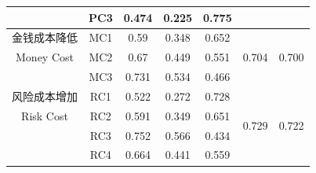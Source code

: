 \begin{table}[H]
\begin{tabular}{@{}ccccccc@{}}
            & PC3           & 0.474                                                                & 0.225                                                                 & 0.775                                                                    &                        &                              \\ \midrule
金钱成本降低      & MC1           & 0.59                                                                 & 0.348                                                                 & 0.652                                                                    &                        &                              \\
Money Cost          & MC2           & 0.67                                                                 & 0.449                                                                 & 0.551                                                                    & 0.704                  & 0.700                        \\
            & MC3           & 0.731                                                                & 0.534                                                                 & 0.466                                                                    &                        &                              \\ \midrule
风险成本增加      & RC1           & 0.522                                                                & 0.272                                                                 & 0.728                                                                    & \multirow{4}{*}{0.729} & \multirow{4}{*}{0.722}       \\
Risk Cost          & RC2           & 0.591                                                                & 0.349                                                                 & 0.651                                                                    &                        &                              \\
            & RC3           & 0.752                                                                & 0.566                                                                 & 0.434                                                                    &                        &                              \\
            & RC4           & 0.664                                                                & 0.441                                                                 & 0.559                                                                    &                        &                              \\ \midrule

\end{tabular}
\end{table}
